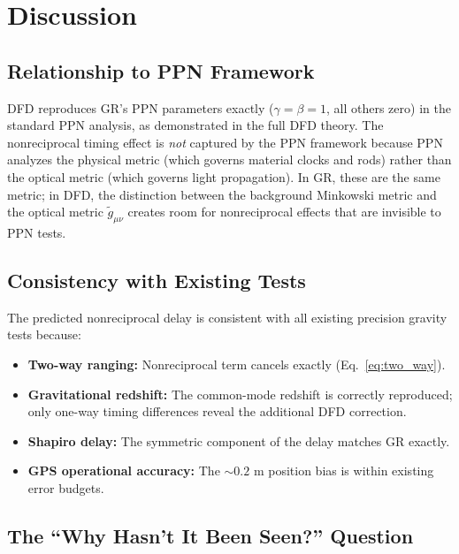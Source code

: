\documentclass[12pt,a4paper,twocolumn]{article}
\begin{document}
\section{Discussion}\label{sec:discussion}

\subsection{Relationship to PPN Framework}

DFD reproduces GR's PPN parameters exactly ($\gamma = \beta = 1$,
all others zero) in the standard PPN analysis, as demonstrated in
the full DFD theory.  The nonreciprocal timing effect is
\emph{not} captured by the PPN framework because PPN analyzes
the physical metric (which governs material clocks and rods)
rather than the optical metric (which governs light propagation).
In GR, these are the same metric; in DFD, the distinction between
the background Minkowski metric and the optical metric
$\tilde{g}_{\mu\nu}$ creates room for nonreciprocal effects
that are invisible to PPN tests.

\subsection{Consistency with Existing Tests}

The predicted nonreciprocal delay is consistent with all existing
precision gravity tests because:
\begin{itemize}[nosep]
\item \textbf{Two-way ranging:} Nonreciprocal term cancels
exactly (Eq.~\ref{eq:two_way}).
\item \textbf{Gravitational redshift:} The common-mode redshift
is correctly reproduced; only one-way timing differences reveal
the additional DFD correction.
\item \textbf{Shapiro delay:} The symmetric component of the
delay matches GR exactly.
\item \textbf{GPS operational accuracy:} The ${\sim}0.2$ m
position bias is within existing error budgets.
\end{itemize}

\subsection{The ``Why Hasn't It Been Seen?'' Question}
\end{document}

